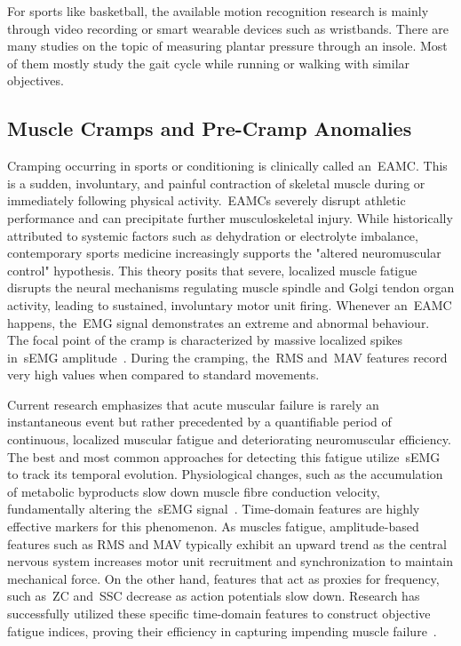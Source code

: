 For sports like basketball, the available motion recognition research is mainly through video recording or smart wearable devices such as 
wristbands. There are many studies on the topic of measuring plantar pressure through an insole. Most of them mostly study the gait cycle 
while running or walking with similar objectives.

\subsection{Muscle Cramps and Pre-Cramp Anomalies}
\label{ssec:cramps}

Cramping occurring in sports or conditioning is clinically called an~\gls{EAMC}. This is a sudden, involuntary, 
and painful contraction of skeletal muscle during or immediately following physical activity.~\glspl{EAMC} severely 
disrupt athletic performance and can precipitate further musculoskeletal injury. While historically attributed to 
systemic factors such as dehydration or electrolyte imbalance, contemporary sports medicine increasingly supports 
the "altered neuromuscular control" hypothesis. This theory posits that severe, localized muscle fatigue disrupts 
the neural mechanisms regulating muscle spindle and Golgi tendon organ activity, leading to sustained, involuntary 
motor unit firing. Whenever an~\gls{EAMC} happens, the~\gls{EMG} signal demonstrates an extreme and abnormal behaviour. The 
focal point of the cramp is characterized by massive localized spikes in~\gls{sEMG} amplitude~\cite{PossibleMechanisms}. During the 
cramping, the~\gls{RMS} and~\gls{MAV} features record very high values when compared to standard movements. 

Current research emphasizes that acute muscular failure is rarely an instantaneous event but rather precedented by 
a quantifiable period of continuous, localized muscular fatigue and deteriorating neuromuscular efficiency. The 
best and most common approaches for detecting this fatigue utilize~\gls{sEMG} to track its temporal evolution. 
Physiological changes, such as the accumulation of metabolic byproducts slow down muscle fibre conduction velocity, 
fundamentally altering the~\gls{sEMG} signal~\cite{TheUseOfSEMG}. Time-domain features are highly effective markers for this 
phenomenon. As muscles fatigue, amplitude-based features such as RMS and MAV typically exhibit an upward trend as 
the central nervous system increases motor unit recruitment and synchronization to maintain mechanical force. On 
the other hand, features that act as proxies for frequency, such as~\gls{ZC} and~\gls{SSC} decrease as action 
potentials slow down. Research has successfully utilized these specific time-domain features to construct objective 
fatigue indices, proving their efficiency in capturing impending muscle failure~\cite{ProposedFatigueIndex}. 

